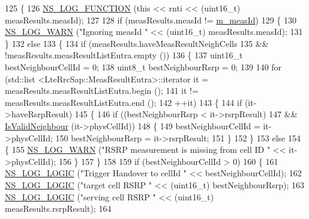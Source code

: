 \begin{DoxyCode}
125 \{
126   \hyperlink{log-macros-disabled_8h_a90b90d5bad1f39cb1b64923ea94c0761}{NS\_LOG\_FUNCTION} (\textcolor{keyword}{this} << rnti << (uint16\_t) measResults.measId);
127 
128   \textcolor{keywordflow}{if} (measResults.measId != \hyperlink{classns3_1_1A3RsrpHandoverAlgorithm_a96ba4646b316fc823618934a7a6d4aa1}{m\_measId})
129     \{
130       \hyperlink{group__logging_gade7208b4009cdf0e25783cd26766f559}{NS\_LOG\_WARN} (\textcolor{stringliteral}{"Ignoring measId "} << (uint16\_t) measResults.measId);
131     \}
132   \textcolor{keywordflow}{else}
133     \{
134       \textcolor{keywordflow}{if} (measResults.haveMeasResultNeighCells
135           && !measResults.measResultListEutra.empty ())
136         \{
137           uint16\_t bestNeighbourCellId = 0;
138           uint8\_t bestNeighbourRsrp = 0;
139 
140           \textcolor{keywordflow}{for} (std::list <LteRrcSap::MeasResultEutra>::iterator it = measResults.measResultListEutra.begin 
      ();
141                it != measResults.measResultListEutra.end ();
142                ++it)
143             \{
144               \textcolor{keywordflow}{if} (it->haveRsrpResult)
145                 \{
146                   \textcolor{keywordflow}{if} ((bestNeighbourRsrp < it->rsrpResult)
147                       && \hyperlink{classns3_1_1A3RsrpHandoverAlgorithm_a09211bfb353fb6ef9df7b379a0a63fd3}{IsValidNeighbour} (it->physCellId))
148                     \{
149                       bestNeighbourCellId = it->physCellId;
150                       bestNeighbourRsrp = it->rsrpResult;
151                     \}
152                 \}
153               \textcolor{keywordflow}{else}
154                 \{
155                   \hyperlink{group__logging_gade7208b4009cdf0e25783cd26766f559}{NS\_LOG\_WARN} (\textcolor{stringliteral}{"RSRP measurement is missing from cell ID "} << it->physCellId);
156                 \}
157             \}
158 
159           \textcolor{keywordflow}{if} (bestNeighbourCellId > 0)
160             \{
161               \hyperlink{group__logging_ga88acd260151caf2db9c0fc84997f45ce}{NS\_LOG\_LOGIC} (\textcolor{stringliteral}{"Trigger Handover to cellId "} << bestNeighbourCellId);
162               \hyperlink{group__logging_ga88acd260151caf2db9c0fc84997f45ce}{NS\_LOG\_LOGIC} (\textcolor{stringliteral}{"target cell RSRP "} << (uint16\_t) bestNeighbourRsrp);
163               \hyperlink{group__logging_ga88acd260151caf2db9c0fc84997f45ce}{NS\_LOG\_LOGIC} (\textcolor{stringliteral}{"serving cell RSRP "} << (uint16\_t) measResults.rsrpResult);
164 

\end{DoxyCode}
